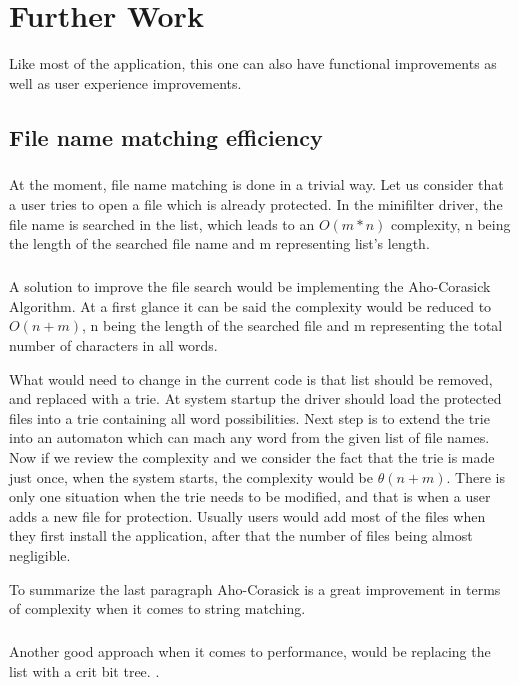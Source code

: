 \chapter{Further Work}

Like most of the application, this one can also have functional improvements as well as user experience improvements. 

\section{File name matching efficiency}

\paragraph{}
At the moment, file name matching is done in a trivial way. Let us consider that a user tries to open a file which is already protected. In the minifilter driver, the file name is searched in the list, which leads to an $O(m*n)$ complexity, n being the length of the searched file name and m representing list's length.
\paragraph{}
A solution to improve the file search would be implementing the Aho-Corasick Algorithm. At a first glance it can be said the complexity would be reduced to $O(n + m)$, n being the length of the searched file and m representing the total number of characters in all words. 

What would need to change in the current code is that list should be removed, and replaced with a trie. At system startup the driver should load the protected files into a trie containing all word possibilities. Next step is to extend the trie into an automaton which can mach any word from the given list of file names. Now if we review the complexity and we consider the fact that the trie is made just once, when the system starts, the complexity would be $\theta(n + m)$. There is only one situation when the trie needs to be modified, and that is when a user adds a new file for protection. Usually users would add most of the files when they first install the application, after that the number of files being almost negligible. 

To summarize the last paragraph Aho-Corasick is a great improvement in terms of complexity when it comes to string matching.

\paragraph{}
Another good approach when it comes to performance, would be replacing the list with a crit bit tree. \cite{CritBitTrees}.


